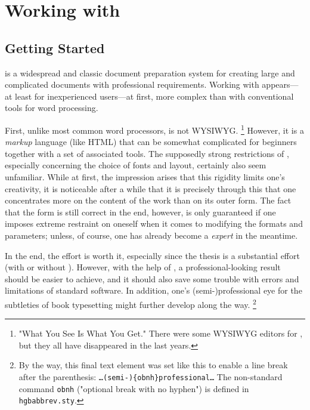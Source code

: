 \chapter{Working with \latex}
\label{cha:WorkingWithLatex}


\section{Getting Started}
\label{sec:LatexGettingStarted}

\latex is a widespread and classic document preparation system for creating
large and complicated documents with professional requirements. Working with
\latex appears---at least for inexperienced users---at first, more complex
than with conventional tools for word processing.

First, unlike most common word processors, \latex is not \textsc{WYSIWYG}.%
\footnote{"What You See Is What You Get." There were some \textsc{WYSIWYG}
editors for \latex, but they all have disappeared in the last years.}
However, it is a \emph{markup} language (like HTML) that can be somewhat
complicated for beginners together with a set of associated tools. The
supposedly strong restrictions of \latex, especially concerning the choice of
fonts and layout, certainly also seem unfamiliar. While at first, the impression
arises that this rigidity limits one's creativity, it is noticeable after a
while that it is precisely through this that one concentrates more on the
content of the work than on its outer form. The fact that the form is still
correct in the end, however, is only guaranteed if one imposes extreme
restraint on oneself when it comes to modifying the formats and parameters;
unless, of course, one has already become a \latex \emph{expert} in the
meantime.

In the end, the effort is worth it, especially since the thesis is a substantial
effort (with or without \latex). However, with the help of \latex, a
professional-looking result should be easier to achieve, and it should also save
some trouble with errors and limitations of standard software. In addition, one's
(semi-){\obnh}professional eye for the subtleties of book typesetting might
further develop along the way.%
\footnote{By the way, this final text element was set like this to enable a line
break after the parenthesis: \texttt{\ldots (semi-)\{{\bs}obnh\}professional\ldots}
The non-standard command \texttt{{\bs}obnh} ("optional break with no hyphen") is
defined in \texttt{hgbabbrev.sty}.}

